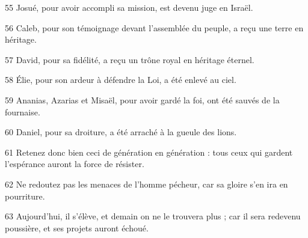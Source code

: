 
55 Josué, pour avoir accompli sa mission, est devenu juge en Israël.

56 Caleb, pour son témoignage devant l’assemblée du peuple, a reçu une terre en héritage.

57 David, pour sa fidélité, a reçu un trône royal en héritage éternel.

58 Élie, pour son ardeur à défendre la Loi, a été enlevé au ciel.

59 Ananias, Azarias et Misaël, pour avoir gardé la foi, ont été sauvés de la fournaise.

60 Daniel, pour sa droiture, a été arraché à la gueule des lions.

61 Retenez donc bien ceci de génération en génération : tous ceux qui gardent l’espérance auront la force de résister.

62 Ne redoutez pas les menaces de l’homme pécheur, car sa gloire s’en ira en pourriture.

63 Aujourd’hui, il s’élève, et demain on ne le trouvera plus ; car il sera redevenu poussière, et ses projets auront échoué.
